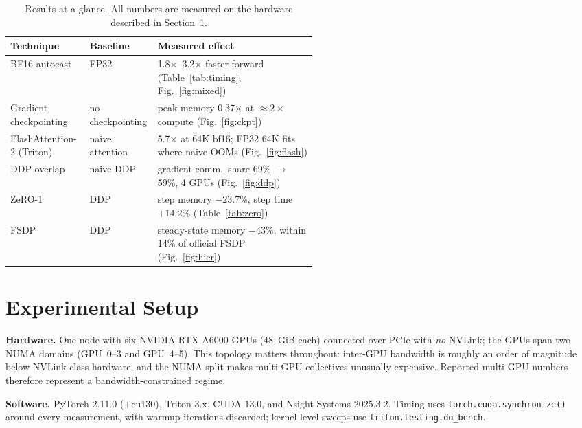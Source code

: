 \documentclass{article}
\begin{document}
\begin{table}[t]
  \caption{Results at a glance. All numbers are measured on the hardware described in Section~\ref{sec:setup}.}
  \label{tab:glance}
  \centering
  \small
  \begin{tabular}{@{}llp{0.52\linewidth}@{}}
    \toprule
    Technique & Baseline & Measured effect \\
    \midrule
    BF16 autocast & FP32 & 1.8$\times$--3.2$\times$ faster forward (Table~\ref{tab:timing}, Fig.~\ref{fig:mixed}) \\
    Gradient checkpointing & no checkpointing & peak memory 0.37$\times$ at ${\approx}2\times$ compute (Fig.~\ref{fig:ckpt}) \\
    FlashAttention-2 (Triton) & naive attention & 5.7$\times$ at 64K bf16; FP32 64K fits where naive OOMs (Fig.~\ref{fig:flash}) \\
    DDP overlap & naive DDP & gradient-comm.\ share 69\% $\rightarrow$ 59\%, 4 GPUs (Fig.~\ref{fig:ddp}) \\
    ZeRO-1 & DDP & step memory $-23.7$\%, step time $+14.2$\% (Table~\ref{tab:zero}) \\
    FSDP & DDP & steady-state memory $-43$\%, within 14\% of official FSDP (Fig.~\ref{fig:hier}) \\
    \bottomrule
  \end{tabular}
\end{table}

\section{Experimental Setup}
\label{sec:setup}

\textbf{Hardware.} One node with six NVIDIA RTX A6000 GPUs (48~GiB each) connected over PCIe with \emph{no} NVLink; the GPUs span two NUMA domains (GPU~0--3 and GPU~4--5). This topology matters throughout: inter-GPU bandwidth is roughly an order of magnitude below NVLink-class hardware, and the NUMA split makes multi-GPU collectives unusually expensive. Reported multi-GPU numbers therefore represent a bandwidth-constrained regime.

\textbf{Software.} PyTorch 2.11.0 (+cu130), Triton 3.x, CUDA 13.0, and Nsight Systems 2025.3.2. Timing uses \texttt{torch.cuda.synchronize()} around every measurement, with warmup iterations discarded; kernel-level sweeps use \texttt{triton.testing.do\_bench}.
\end{document}
